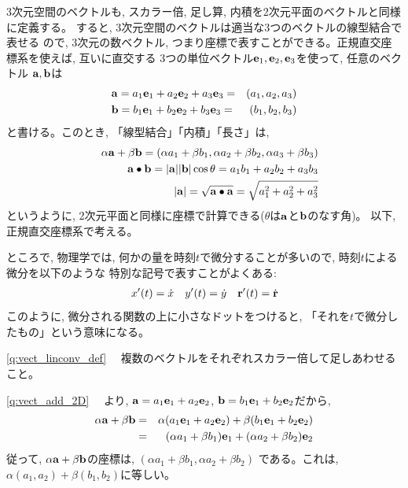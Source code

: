3次元空間のベクトルも, スカラー倍, 足し算, 内積を2次元平面のベクトルと同様に定義する。
すると, 3次元空間のベクトルは適当な3つのベクトルの線型結合で表せる
ので, 3次元の数ベクトル, つまり座標で表すことができる。正規直交座標系を使えば, 互いに直交する
3つの単位ベクトル${\bf e}_1, {\bf e}_2, {\bf e}_3$を使って, 任意のベクトル
${\bf a}, {\bf b}$は
\begin{eqnarray}
&{\bf a}=a_1{\bf e}_1+a_2{\bf e}_2+a_3{\bf e}_3=&(a_1, a_2, a_3)\\
&{\bf b}=b_1{\bf e}_1+b_2{\bf e}_2+b_3{\bf e}_3=&(b_1, b_2, b_3)
\end{eqnarray}
と書ける。このとき, 「線型結合」「内積」「長さ」は, 
\begin{eqnarray*}
&&\alpha{\bf a}+\beta{\bf b}=(\alpha a_1+\beta b_1, \alpha a_2+\beta b_2, \alpha a_3+\beta b_3)\\
&&{\bf a}\bullet{\bf b}=|{\bf a}||{\bf b}|\cos\theta =a_1b_1+a_2b_2+a_3b_3\\
&&|{\bf a}|= \sqrt{{\bf a}\bullet{\bf a}}=\sqrt{a_1^2+a_2^2+a_3^2}
\end{eqnarray*}
というように, 2次元平面と同様に座標で計算できる($\theta$は${\bf a}$と${\bf b}$のなす角)。
以下, 正規直交座標系で考える。
\mv






ところで, 物理学では, 何かの量を時刻$t$で微分することが多いので, 時刻$t$による微分を以下のような
特別な記号で表すことがよくある:
\begin{eqnarray}
x'(t)=\dot{x}\quad y'(t)=\dot{y}\quad {\bf r}'(t)=\dot{\bf r}
\end{eqnarray}
このように, 微分される関数の上に小さなドットをつけると, 「それを$t$で微分したもの」という意味になる。
\vv




\ref{q:vect_linconv_def}
　複数のベクトルをそれぞれスカラー倍して足しあわせること。
\mv

\ref{q:vect_add_2D}　
より, ${\bf a}=a_1{\bf e}_1 + a_2{\bf e}_2$, 
${\bf b}=b_1{\bf e}_1 + b_2{\bf e}_2$だから, 
\begin{eqnarray*}
\alpha{\bf a}+\beta{\bf b}&=&\alpha(a_1{\bf e}_1 + a_2{\bf e}_2)+\beta(b_1{\bf e}_1 + b_2{\bf e}_2)\\
&=&(\alpha a_1 + \beta b_1){\bf e}_1 + (\alpha a_2 + \beta b_2) {\bf e}_2
\end{eqnarray*}
従って, $\alpha{\bf a}+\beta{\bf b}$の座標は, 
$(\alpha a_1 + \beta b_1, \alpha a_2 + \beta b_2)$
である。これは, $\alpha (a_1,a_2) + \beta (b_1,b_2)$に等しい。
\mv

